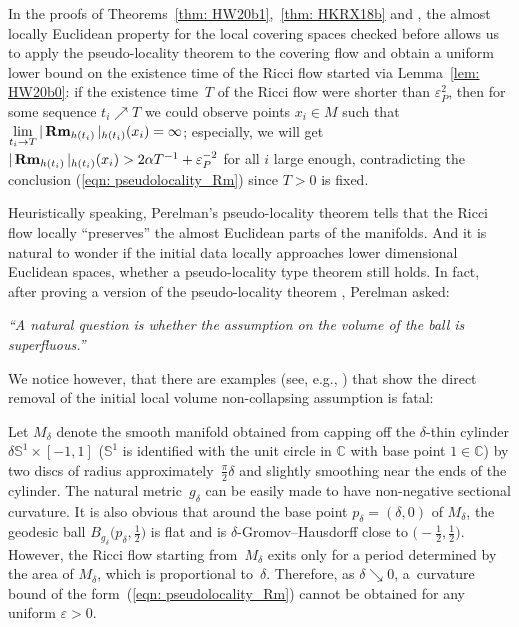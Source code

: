 \documentclass[10pt,a4paper]{amsart}
\numberwithin{equation}{section}
\newcommand{\Rm}{\operatorname{\bf Rm}}
\begin{document}
In the proofs of Theorems~\ref{thm: HW20b1},~\ref{thm: HKRX18b} and
\cite[Theorem~7.2]{Kapovitch19}, the almost locally Euclidean property for the
local covering spaces checked before allows us to apply the pseudo-locality
theorem to the covering flow and obtain a uniform lower bound on the existence
time of the Ricci flow started via Lemma~\ref{lem: HW20b0}: if the existence
time~$T$ of the Ricci flow were shorter than $\varepsilon_P^2$, then for some
sequence $t_i\nearrow T$ we could observe points $x_i\in M$ such that
$\lim\limits_{t_i\to T} |\Rm_{h(t_i)} |_{h(t_i)}(x_i)= \infty$; especially,
we will get $ |\Rm_{h(t_i)} |_{h(t_i)}(x_i)>2\alpha
T^{-1}+\varepsilon_P^{-2}$ for all $i$ large enough, contradicting the
conclusion (\ref{eqn: pseudolocality_Rm}) since $T>0$ is fixed.

Heuristically speaking, Perelman's pseudo-locality theorem tells that the Ricci
flow locally ``preserves'' the almost Euclidean parts of the manifolds. And it
is natural to wonder if the initial data locally approaches lower dimensional
Euclidean spaces, whether a pseudo-locality type theorem still holds. In fact,
after proving a version of the pseudo-locality theorem \cite[Theorem~10.3]{Perelman}, Perelman asked:

\emph{``A natural question is whether the assumption on the volume of the ball
is superfluous.''}

We notice however, that there are examples (see, e.g., \cite{Lu10, HKRX18}) that
show the direct removal of the initial local volume non-collapsing assumption
is fatal:
\begin{Example}[Topping]
Let $M_{\delta}$ denote the smooth manifold obtained from capping off the
$\delta$-thin cylinder $\delta \mathbb{S}^1\times [-1,1]$ ($\mathbb{S}^1$ is
identified with the unit circle in $\mathbb{C}$ with base point $1\in
\mathbb{C}$) by two discs of radius approximately~$\frac{\pi}{2}\delta$ and
slightly smoothing near the ends of the cylinder. The natural metric~$g_{\delta}$ can be easily made to have non-negative sectional curvature. It is
also obvious that around the base point $p_{\delta}=(\delta,0)$ of $M_{\delta}$,
the geodesic ball $B_{g_{\delta}}\big(p_{\delta},\frac{1}{2}\big)$ is flat and is
$\delta$-Gromov--Hausdorff close to $\big({-}\frac{1}{2},\frac{1}{2}\big)$.
 However, the Ricci flow starting from~$M_{\delta}$ exits only for a period
 determined by the area of $M_{\delta}$, which is proportional to~$\delta$.
 Therefore, as $\delta\searrow 0$, a~curvature bound of the form~(\ref{eqn:
 pseudolocality_Rm}) cannot be obtained for any uniform $\varepsilon>0$.
\end{Example}
\end{document}
